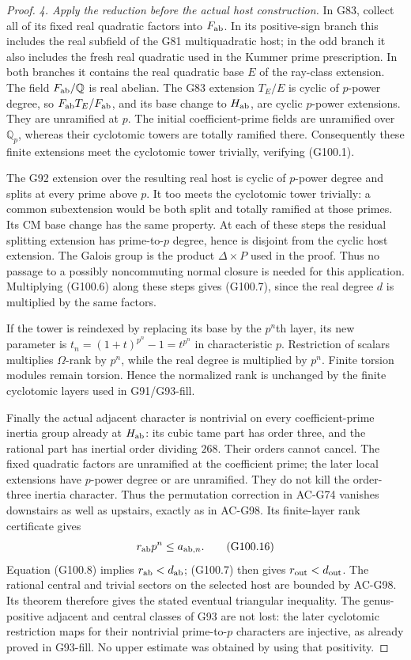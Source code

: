 \begin{proof}
\emph{4. Apply the reduction before the actual host construction.}
In G83, collect all of its fixed real quadratic factors into
$F_{\rm ab}$.  In its positive-sign branch this includes the
real subfield of the G81 multiquadratic host; in the odd branch
it also includes the fresh real quadratic used in the Kummer
prime prescription.  In both branches it contains the real
quadratic base $E$ of the ray-class extension.
The field $F_{\rm ab}/\mathbb Q$ is real abelian.  The
G83 extension $T_E/E$ is cyclic of $p$-power degree, so
$F_{\rm ab}T_E/F_{\rm ab}$, and its base change to
$H_{\rm ab}$, are cyclic $p$-power extensions.
They are unramified at $p$.  The initial coefficient-prime
fields are unramified over $\mathbb Q_p$, whereas their
cyclotomic towers are totally ramified there.
Consequently these finite extensions meet the cyclotomic tower
trivially, verifying (G100.1).

The G92 extension over the resulting real host is cyclic of
$p$-power degree and splits at every prime above $p$.
It too meets the cyclotomic tower trivially: a common subextension
would be both split and totally ramified at those primes.
Its CM base change has the same property.
At each of these steps the residual splitting extension has
prime-to-$p$ degree, hence is disjoint from the cyclic host
extension.  The Galois group is the product $\Delta\times P$
used in the proof.  Thus no passage to a possibly noncommuting
normal closure is needed for this application.
Multiplying (G100.6) along these steps gives (G100.7), since
the real degree $d$ is multiplied by the same factors.

If the tower is reindexed by replacing its base by the $p^n$th
layer, its new parameter is
$t_n=(1+t)^{p^n}-1=t^{p^n}$ in characteristic $p$.
Restriction of scalars multiplies $\Omega$-rank by $p^n$,
while the real degree is multiplied by $p^n$.
Finite torsion modules remain torsion.  Hence the normalized rank
is unchanged by the finite cyclotomic layers used in G91/G93-fill.

Finally the actual adjacent character is nontrivial on every
coefficient-prime inertia group already at $H_{\rm ab}$:
its cubic tame part has order three, and the rational part has
inertial order dividing $268$.  Their orders cannot cancel.
The fixed quadratic factors are unramified at the coefficient
prime; the later local extensions have $p$-power degree or are
unramified.  They do not kill the order-three inertia character.
Thus the permutation correction in AC-G74 vanishes downstairs
as well as upstairs, exactly as in AC-G98.  Its finite-layer
rank certificate gives
\[
                         r_{\rm ab}p^n\le a_{{\rm ab},n}.
 \tag{G100.16}
\]
Equation (G100.8) implies $r_{\rm ab}<d_{\rm ab}$; (G100.7)
then gives $r_{\rm out}<d_{\rm out}$.
The rational central and trivial sectors on the selected host
are bounded by AC-G98.  Its theorem therefore gives the stated
eventual triangular inequality.  The genus-positive adjacent and
central classes of G93 are not lost: the later cyclotomic
restriction maps for their nontrivial prime-to-$p$ characters
are injective, as already proved in G93-fill.
No upper estimate was obtained by using that positivity.
\end{proof}

